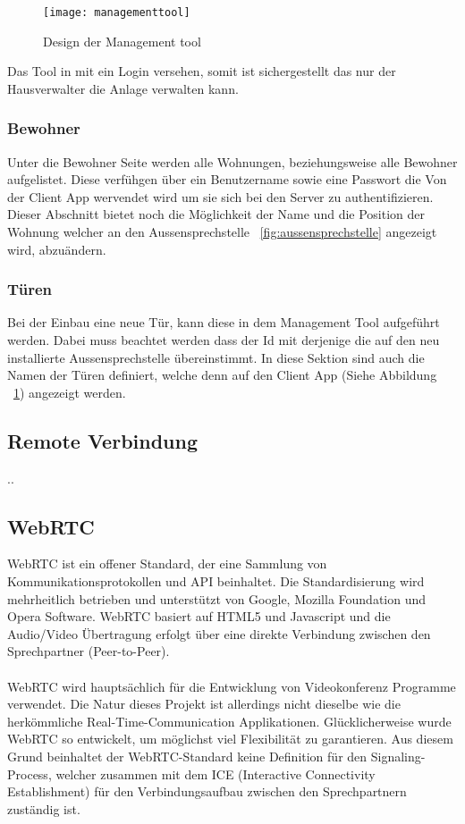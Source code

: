 \begin{figure}[htb!]
	\begin{center}
		\texttt{[image: managementtool]}
		\caption[Design der Management tool]{Design der Management tool}
		\label{fig:managementtool}
	\end{center}
\end{figure}

Das Tool in mit ein Login versehen, somit ist sichergestellt das nur der Hausverwalter die Anlage verwalten kann. 
\subsubsection{Bewohner}
Unter die Bewohner Seite werden alle Wohnungen, beziehungsweise alle Bewohner aufgelistet. Diese verfühgen über ein Benutzername sowie eine Passwort die Von der Client App wervendet wird um sie sich bei den Server zu authentifizieren. Dieser Abschnitt bietet noch die Möglichkeit der Name und die Position der Wohnung welcher an den Aussensprechstelle ~\ref{fig:aussensprechstelle} angezeigt wird, abzuändern.
\subsubsection{Türen}
Bei der Einbau eine neue Tür, kann diese in dem Management Tool aufgeführt werden. Dabei muss beachtet werden dass der Id mit derjenige die auf den neu installierte Aussensprechstelle übereinstimmt. In diese Sektion sind auch die Namen der Türen definiert, welche denn auf den Client App (Siehe Abbildung ~\ref{fig:managementtool})  angezeigt werden. 


\subsection{Remote Verbindung}
\label{kap:remote}
..

\subsection{WebRTC}
\label{kap:webrtc}
WebRTC ist ein offener Standard, der eine Sammlung von Kommunikationsprotokollen und API beinhaltet. Die Standardisierung wird mehrheitlich betrieben und unterstützt von Google, Mozilla Foundation und Opera Software. WebRTC basiert auf HTML5 und Javascript und die Audio/Video Übertragung erfolgt über eine direkte Verbindung zwischen den Sprechpartner (Peer-to-Peer).
\\
\\
WebRTC wird hauptsächlich für die Entwicklung von Videokonferenz Programme verwendet. Die Natur dieses Projekt ist allerdings nicht dieselbe wie die herkömmliche Real-Time-Communication Applikationen. Glücklicherweise wurde WebRTC so entwickelt, um möglichst viel Flexibilität zu garantieren. Aus diesem Grund beinhaltet der WebRTC-Standard keine Definition für den Signaling-Process, welcher zusammen mit dem ICE (Interactive Connectivity Establishment) für den Verbindungsaufbau zwischen den Sprechpartnern zuständig ist. 


